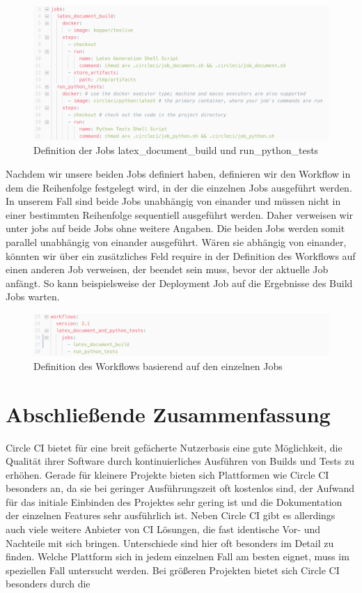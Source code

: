 \documentclass[11pt]{article}
\begin{document}
\begin{figure}[H]
	\centering
  	\includegraphics[width=1\linewidth]{../Images/Config/Jobs}
  	\caption{Definition der Jobs latex\_document\_build und run\_python\_tests}
  	\label{fig:jobs}
\end{figure}

Nachdem wir unsere beiden Jobs definiert haben, definieren wir den Workflow in dem die Reihenfolge festgelegt wird, in der die einzelnen Jobs ausgeführt werden. In unserem Fall sind beide Jobs unabhängig von einander und müssen nicht in einer bestimmten Reihenfolge sequentiell ausgeführt werden. Daher verweisen wir unter jobs auf beide Jobs ohne weitere Angaben. Die beiden Jobs werden somit parallel unabhängig von einander ausgeführt. Wären sie abhängig von einander, könnten wir über ein zusätzliches Feld require in der Definition des Workflows auf einen anderen Job verweisen, der beendet sein muss, bevor der aktuelle Job anfängt. So kann beispielsweise der Deployment Job auf die Ergebnisse des Build Jobs warten.

\begin{figure}[H]
	\centering
  	\includegraphics[width=1\linewidth]{../Images/Config/Workflow}
  	\caption{Definition des Workflows basierend auf den einzelnen Jobs}
  	\label{fig:workflow}
\end{figure}

\section{Abschließende Zusammenfassung}
Circle CI bietet für eine breit gefächerte Nutzerbasis eine gute Möglichkeit, die Qualität ihrer Software durch kontinuierliches Ausführen von Builds und Tests zu erhöhen. Gerade für kleinere Projekte bieten sich Plattformen wie Circle CI besonders an, da sie bei geringer Ausführungszeit oft kostenlos sind, der Aufwand für das initiale Einbinden des Projektes sehr gering ist und die Dokumentation der einzelnen Features sehr ausführlich ist. Neben Circle CI gibt es allerdings auch viele weitere Anbieter von CI Lösungen, die fast identische Vor- und Nachteile mit sich bringen. Unterschiede sind hier oft besonders im Detail zu finden. Welche Plattform sich in jedem einzelnen Fall am besten eignet, muss im speziellen Fall untersucht werden.
Bei größeren Projekten bietet sich Circle CI besonders durch die 
\end{document}
